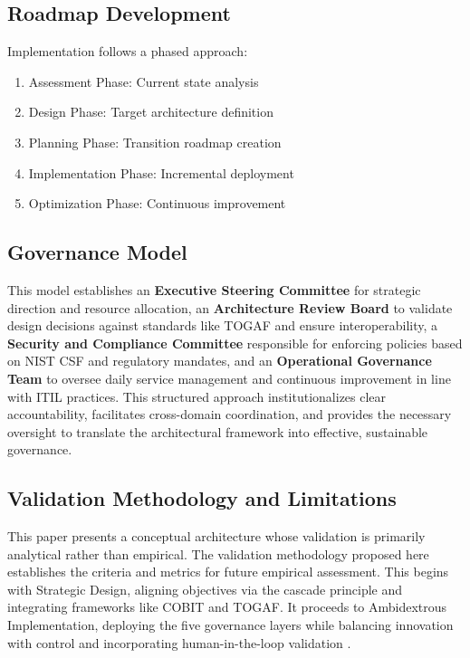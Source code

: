\documentclass{IET-Conf-Paper}
\begin{document}
\subsection{Roadmap Development}
    Implementation follows a phased approach:
    \begin{enumerate}
    \item Assessment Phase: Current state analysis
    \item Design Phase: Target architecture definition
    \item Planning Phase: Transition roadmap creation
    \item Implementation Phase: Incremental deployment
    \item Optimization Phase: Continuous improvement
    \end{enumerate}

\subsection{Governance Model}
    This model establishes an\textbf{ Executive Steering Committee} for strategic direction and resource allocation, an \textbf{Architecture Review Board} to validate design decisions against standards like TOGAF and ensure interoperability, a \textbf{Security and Compliance Committee} responsible for enforcing policies based on NIST CSF and regulatory mandates, and an \textbf{Operational Governance Team} to oversee daily service management and continuous improvement in line with ITIL practices. This structured approach institutionalizes clear accountability, facilitates cross-domain coordination, and provides the necessary oversight to translate the architectural framework into effective, sustainable governance.

\subsection{Validation Methodology and Limitations}
    This paper presents a conceptual architecture whose validation is primarily analytical rather than empirical. The validation methodology proposed here establishes the criteria and metrics for future empirical assessment.
    This begins with Strategic Design, aligning objectives via the cascade principle and integrating frameworks like COBIT and TOGAF. It proceeds to Ambidextrous Implementation, deploying the five governance layers while balancing innovation with control \cite{Lestari2025Designing} and incorporating human-in-the-loop validation \cite{McIntosh2024From}. 
    
\end{document}
